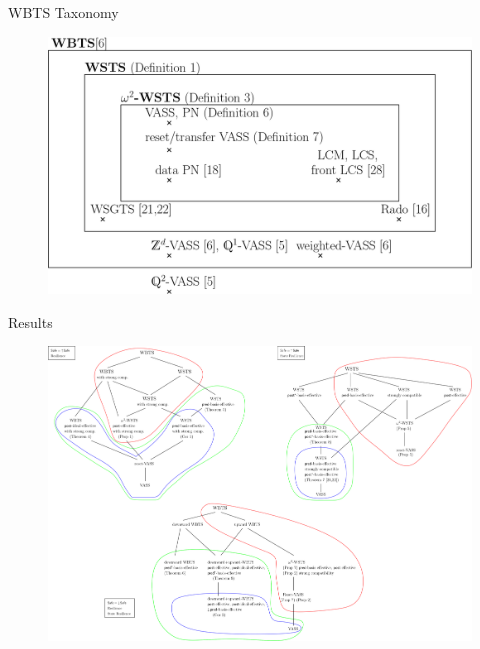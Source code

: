 \documentclass{beamer}
\begin{document}
  \begin{frame}{WBTS Taxonomy}
  
   \begin{center}
 	\begin{figure}
\includegraphics[width=.80\textwidth]{WSTS_taxonomy_large}
	\end{figure}
\end{center}  



  \end{frame}
  \begin{frame}{Results}
  
  
   \begin{center}
 	\begin{figure}
 	\hspace{-2.cm}
\includegraphics[width=1.00\textwidth]{All_results}
	\end{figure}
\end{center}  
    
  \end{frame}
\end{document}
